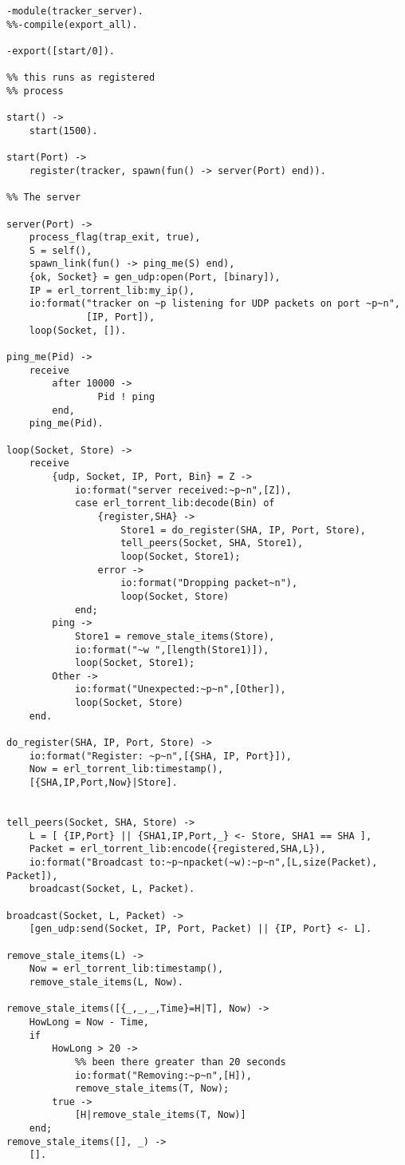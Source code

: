 \documentclass[10pt]{article}
\begin{document}
\begin{Verbatim}
-module(tracker_server).
%%-compile(export_all).

-export([start/0]).

%% this runs as registered
%% process

start() ->
    start(1500).

start(Port) ->
    register(tracker, spawn(fun() -> server(Port) end)).

%% The server             

server(Port) ->
    process_flag(trap_exit, true),
    S = self(),
    spawn_link(fun() -> ping_me(S) end),
    {ok, Socket} = gen_udp:open(Port, [binary]),
    IP = erl_torrent_lib:my_ip(),
    io:format("tracker on ~p listening for UDP packets on port ~p~n",
              [IP, Port]),
    loop(Socket, []).

ping_me(Pid) ->
    receive
        after 10000 ->
                Pid ! ping
        end,
    ping_me(Pid).

loop(Socket, Store) ->
    receive
        {udp, Socket, IP, Port, Bin} = Z ->
            io:format("server received:~p~n",[Z]),
            case erl_torrent_lib:decode(Bin) of
                {register,SHA} ->
                    Store1 = do_register(SHA, IP, Port, Store),
                    tell_peers(Socket, SHA, Store1),
                    loop(Socket, Store1);
                error ->
                    io:format("Dropping packet~n"),
                    loop(Socket, Store)
            end;
        ping ->
            Store1 = remove_stale_items(Store),
            io:format("~w ",[length(Store1)]),
            loop(Socket, Store1);
        Other ->
            io:format("Unexpected:~p~n",[Other]),
            loop(Socket, Store)
    end.

do_register(SHA, IP, Port, Store) ->
    io:format("Register: ~p~n",[{SHA, IP, Port}]),
    Now = erl_torrent_lib:timestamp(),
    [{SHA,IP,Port,Now}|Store].


tell_peers(Socket, SHA, Store) ->
    L = [ {IP,Port} || {SHA1,IP,Port,_} <- Store, SHA1 == SHA ],
    Packet = erl_torrent_lib:encode({registered,SHA,L}),
    io:format("Broadcast to:~p~npacket(~w):~p~n",[L,size(Packet), Packet]),
    broadcast(Socket, L, Packet).

broadcast(Socket, L, Packet) ->
    [gen_udp:send(Socket, IP, Port, Packet) || {IP, Port} <- L].

remove_stale_items(L) ->
    Now = erl_torrent_lib:timestamp(),
    remove_stale_items(L, Now).

remove_stale_items([{_,_,_,Time}=H|T], Now) ->
    HowLong = Now - Time,
    if
        HowLong > 20 ->
            %% been there greater than 20 seconds
            io:format("Removing:~p~n",[H]),
            remove_stale_items(T, Now);
        true ->
            [H|remove_stale_items(T, Now)]
    end;
remove_stale_items([], _) ->
    [].

\end{Verbatim}
\end{document}
